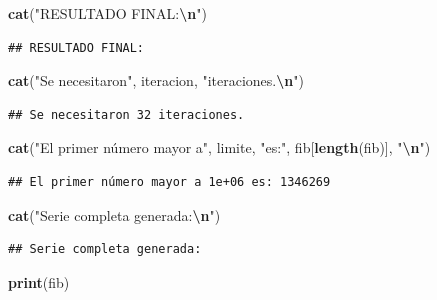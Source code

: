 \documentclass[]{llncs}
\newenvironment{Shaded}{\begin{snugshade}}{\end{snugshade}}
\newcommand{\FunctionTok}[1]{\textcolor[rgb]{0.13,0.29,0.53}{\textbf{#1}}}
\newcommand{\NormalTok}[1]{#1}
\newcommand{\SpecialCharTok}[1]{\textcolor[rgb]{0.81,0.36,0.00}{\textbf{#1}}}
\newcommand{\StringTok}[1]{\textcolor[rgb]{0.31,0.60,0.02}{#1}}
\begin{document}
\begin{Shaded}
\begin{Highlighting}[]
\FunctionTok{cat}\NormalTok{(}\StringTok{"RESULTADO FINAL:}\SpecialCharTok{\textbackslash{}n}\StringTok{"}\NormalTok{)}
\end{Highlighting}
\end{Shaded}

\begin{verbatim}
## RESULTADO FINAL:
\end{verbatim}

\begin{Shaded}
\begin{Highlighting}[]
\FunctionTok{cat}\NormalTok{(}\StringTok{"Se necesitaron"}\NormalTok{, iteracion, }\StringTok{"iteraciones.}\SpecialCharTok{\textbackslash{}n}\StringTok{"}\NormalTok{)}
\end{Highlighting}
\end{Shaded}

\begin{verbatim}
## Se necesitaron 32 iteraciones.
\end{verbatim}

\begin{Shaded}
\begin{Highlighting}[]
\FunctionTok{cat}\NormalTok{(}\StringTok{"El primer número mayor a"}\NormalTok{, limite, }\StringTok{"es:"}\NormalTok{, fib[}\FunctionTok{length}\NormalTok{(fib)], }\StringTok{"}\SpecialCharTok{\textbackslash{}n}\StringTok{"}\NormalTok{)}
\end{Highlighting}
\end{Shaded}

\begin{verbatim}
## El primer número mayor a 1e+06 es: 1346269
\end{verbatim}

\begin{Shaded}
\begin{Highlighting}[]
\FunctionTok{cat}\NormalTok{(}\StringTok{"Serie completa generada:}\SpecialCharTok{\textbackslash{}n}\StringTok{"}\NormalTok{)}
\end{Highlighting}
\end{Shaded}

\begin{verbatim}
## Serie completa generada:
\end{verbatim}

\begin{Shaded}
\begin{Highlighting}[]
\FunctionTok{print}\NormalTok{(fib)}
\end{Highlighting}
\end{Shaded}
\end{document}
